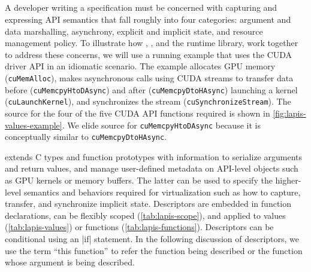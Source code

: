 {%




\subsection{\Lapis}

A developer writing a \Lapis specification must be concerned with
capturing and expressing API semantics that fall roughly into four categories:
argument and data marshalling, asynchrony, explicit and implicit state,
and resource management policy.
To illustrate how \CAvA, \Lapis, and the runtime library,
work together to address these concerns, we will use a running example that
uses the CUDA driver API in an idiomatic scenario. The example allocates GPU memory (\texttt{cuMemAlloc}), makes
asynchronous calls using CUDA streams to transfer data before (\texttt{cuMemcpyHtoDAsync}) and after (\texttt{cuMemcpyDtoHAsync}) launching a kernel (\texttt{cuLaunch\-Kernel}),
and synchronizes the stream (\texttt{cuSynchronize\-Stream}).
The \Lapis source for the four of the five CUDA API functions required is shown in \autoref{fig:lapis-values-example}. We
elide source for \texttt{cuMemcpyHtoDAsync} because it is conceptually similar to \texttt{cuMemcpyDtoHAsync}.

\Lapis extends C types and function prototypes with information to serialize arguments and return values,
and manage user-defined metadata on API-level objects such as GPU kernels or memory buffers. The latter can be used to
specify the higher-level semantics and behaviors required for virtualization such as how to capture, transfer, and synchronize implicit state.
Descriptors are embedded in \Lapis function declarations,
can be flexibly scoped (\autoref{tab:lapis-scope}), and
applied to values (\autoref{tab:lapis-values}) or functions (\autoref{tab:lapis-functions}).
Descriptors can be conditional using an \spec|if| statement.
In the following discussion of \Lapis descriptors, we use the term ``this function'' to refer the function
being described or the function whose argument is being described.

}
